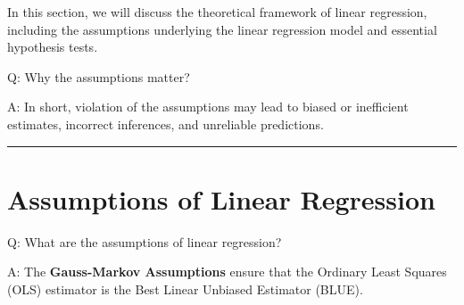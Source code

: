 \documentclass[
  12pt,
  letterpaper,
]{scrbook}
\theoremstyle{plain}
\theoremstyle{definition}
\theoremstyle{remark}
\begin{document}
In this section, we will discuss the theoretical framework of linear
regression, including the assumptions underlying the linear regression
model and essential hypothesis tests.

Q: Why the assumptions matter?

A: In short, violation of the assumptions may lead to biased or
inefficient estimates, incorrect inferences, and unreliable predictions.

\begin{center}\rule{0.5\linewidth}{0.5pt}\end{center}

\section{Assumptions of Linear
Regression}\label{assumptions-of-linear-regression}

Q: What are the assumptions of linear regression?

A: The \textbf{Gauss-Markov Assumptions} ensure that the Ordinary Least
Squares (OLS) estimator is the Best Linear Unbiased Estimator (BLUE).
\end{document}

